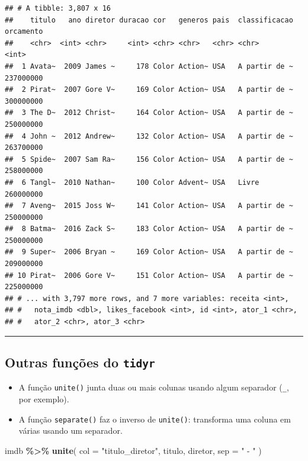 \documentclass[
]{book}
\newenvironment{Shaded}{\begin{snugshade}}{\end{snugshade}}
\newcommand{\DataTypeTok}[1]{\textcolor[rgb]{0.13,0.29,0.53}{#1}}
\newcommand{\KeywordTok}[1]{\textcolor[rgb]{0.13,0.29,0.53}{\textbf{#1}}}
\newcommand{\NormalTok}[1]{#1}
\newcommand{\OperatorTok}[1]{\textcolor[rgb]{0.81,0.36,0.00}{\textbf{#1}}}
\newcommand{\StringTok}[1]{\textcolor[rgb]{0.31,0.60,0.02}{#1}}
\begin{document}
\begin{verbatim}
## # A tibble: 3,807 x 16
##    titulo   ano diretor duracao cor   generos pais  classificacao orcamento
##    <chr>  <int> <chr>     <int> <chr> <chr>   <chr> <chr>             <int>
##  1 Avata~  2009 James ~     178 Color Action~ USA   A partir de ~ 237000000
##  2 Pirat~  2007 Gore V~     169 Color Action~ USA   A partir de ~ 300000000
##  3 The D~  2012 Christ~     164 Color Action~ USA   A partir de ~ 250000000
##  4 John ~  2012 Andrew~     132 Color Action~ USA   A partir de ~ 263700000
##  5 Spide~  2007 Sam Ra~     156 Color Action~ USA   A partir de ~ 258000000
##  6 Tangl~  2010 Nathan~     100 Color Advent~ USA   Livre         260000000
##  7 Aveng~  2015 Joss W~     141 Color Action~ USA   A partir de ~ 250000000
##  8 Batma~  2016 Zack S~     183 Color Action~ USA   A partir de ~ 250000000
##  9 Super~  2006 Bryan ~     169 Color Action~ USA   A partir de ~ 209000000
## 10 Pirat~  2006 Gore V~     151 Color Action~ USA   A partir de ~ 225000000
## # ... with 3,797 more rows, and 7 more variables: receita <int>,
## #   nota_imdb <dbl>, likes_facebook <int>, id <int>, ator_1 <chr>,
## #   ator_2 <chr>, ator_3 <chr>
\end{verbatim}

\begin{center}\rule{0.5\linewidth}{0.5pt}\end{center}

\hypertarget{outras-funuxe7uxf5es-do-tidyr}{%
\subsection{\texorpdfstring{Outras funções do \texttt{tidyr}}{Outras funções do tidyr}}\label{outras-funuxe7uxf5es-do-tidyr}}

\begin{itemize}
\item
  A função \texttt{unite()} junta duas ou mais colunas usando algum separador (\texttt{\_}, por exemplo).
\item
  A função \texttt{separate()} faz o inverso de \texttt{unite()}: transforma uma coluna em várias usando um separador.
\end{itemize}

\begin{Shaded}
\begin{Highlighting}[]
\NormalTok{imdb }\OperatorTok{\%>\%}
\StringTok{  }\KeywordTok{unite}\NormalTok{(}
    \DataTypeTok{col =} \StringTok{"titulo\_diretor"}\NormalTok{,}
\NormalTok{    titulo, diretor,}
    \DataTypeTok{sep =} \StringTok{" {-} "}
\NormalTok{  )}
\end{Highlighting}
\end{Shaded}
\end{document}
